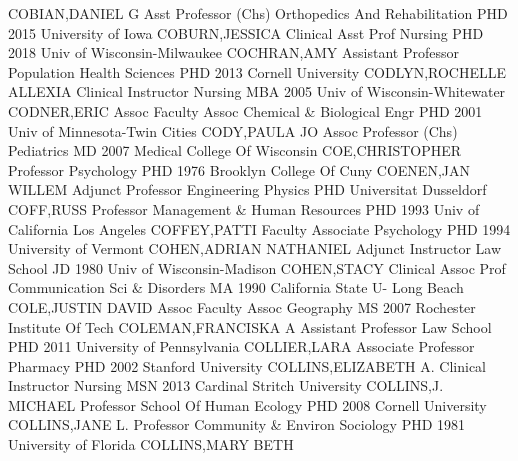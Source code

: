 \documentclass[
]{article}
\begin{document}
\textbar COBIAN,DANIEL G \textbar{}  \textbar Asst Professor
(Chs) \textbar Orthopedics And Rehabilitation \textbar PHD 2015
University of Iowa \textbar COBURN,JESSICA \textbar{} 
\textbar Clinical Asst Prof \textbar Nursing \textbar PHD 2018 Univ of
Wisconsin-Milwaukee \textbar COCHRAN,AMY \textbar{} 
\textbar Assistant Professor \textbar Population Health Sciences
\textbar PHD 2013 Cornell University \textbar CODLYN,ROCHELLE ALLEXIA
\textbar{}  \textbar Clinical Instructor \textbar Nursing
\textbar MBA 2005 Univ of Wisconsin-Whitewater \textbar CODNER,ERIC
\textbar{}  \textbar Assoc Faculty Assoc \textbar Chemical \&
Biological Engr \textbar PHD 2001 Univ of Minnesota-Twin Cities
\textbar CODY,PAULA JO \textbar{}  \textbar Assoc Professor
(Chs) \textbar Pediatrics \textbar MD 2007 Medical College Of Wisconsin
\textbar COE,CHRISTOPHER \textbar{}  \textbar Professor
\textbar Psychology \textbar PHD 1976 Brooklyn College Of Cuny
\textbar COENEN,JAN WILLEM \textbar{}  \textbar Adjunct
Professor \textbar Engineering Physics \textbar PHD Universitat
Dusseldorf \textbar COFF,RUSS \textbar{}  \textbar Professor
\textbar Management \& Human Resources \textbar PHD 1993 Univ of
California Los Angeles \textbar COFFEY,PATTI \textbar{} 
\textbar Faculty Associate \textbar Psychology \textbar PHD 1994
University of Vermont \textbar COHEN,ADRIAN NATHANIEL \textbar{}
 \textbar Adjunct Instructor \textbar Law School \textbar JD
1980 Univ of Wisconsin-Madison \textbar COHEN,STACY \textbar{}
 \textbar Clinical Assoc Prof \textbar Communication Sci \&
Disorders \textbar MA 1990 California State U- Long Beach
\textbar COLE,JUSTIN DAVID \textbar{}  \textbar Assoc Faculty
Assoc \textbar Geography \textbar MS 2007 Rochester Institute Of Tech
\textbar COLEMAN,FRANCISKA A \textbar{}  \textbar Assistant
Professor \textbar Law School \textbar PHD 2011 University of
Pennsylvania \textbar COLLIER,LARA \textbar{} 
\textbar Associate Professor \textbar Pharmacy \textbar PHD 2002
Stanford University \textbar COLLINS,ELIZABETH A. \textbar{} 
\textbar Clinical Instructor \textbar Nursing \textbar MSN 2013 Cardinal
Stritch University \textbar COLLINS,J. MICHAEL \textbar{} 
\textbar Professor \textbar School Of Human Ecology \textbar PHD 2008
Cornell University \textbar COLLINS,JANE L. \textbar{} 
\textbar Professor \textbar Community \& Environ Sociology \textbar PHD
1981 University of Florida \textbar COLLINS,MARY BETH \textbar{}
\end{document}
